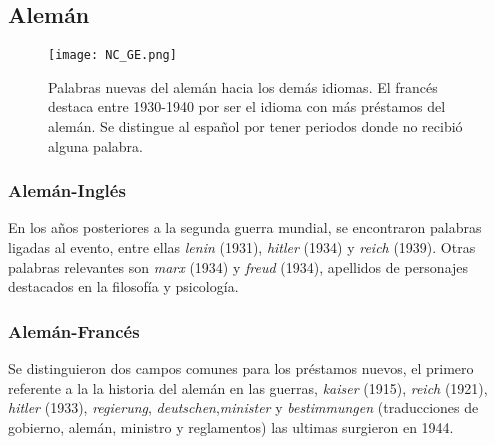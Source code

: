 

\subsection{Alemán}%

\begin{figure}
	\centering
	\texttt{[image: NC\_GE.png]}
	\label{fig.NC_GE}
	\caption{Palabras nuevas del alemán hacia los demás idiomas. El francés destaca  entre 1930-1940 por ser el idioma con más préstamos del alemán. Se distingue al español por tener periodos donde no recibió alguna palabra.}  
\end{figure}




\subsubsection*{Alemán-Inglés}%

En los años posteriores a la segunda guerra mundial, se encontraron palabras ligadas al evento, entre ellas \textit{lenin} (1931), \textit{hitler} (1934) y \textit{reich} (1939).  Otras palabras relevantes son \textit{marx} (1934) y \textit{freud} (1934), apellidos de personajes destacados en la filosofía y psicología. 


\subsubsection*{Alemán-Francés}%


Se distinguieron dos campos comunes para los préstamos nuevos,  el primero referente a la  la historia del alemán en las guerras, \textit{kaiser} (1915), \textit{reich} (1921), \textit{hitler} (1933),  \textit{regierung}, \textit{deutschen},\textit{minister} y  \textit{bestimmungen} (traducciones de gobierno, alemán, ministro y reglamentos) las ultimas surgieron en 1944.  

